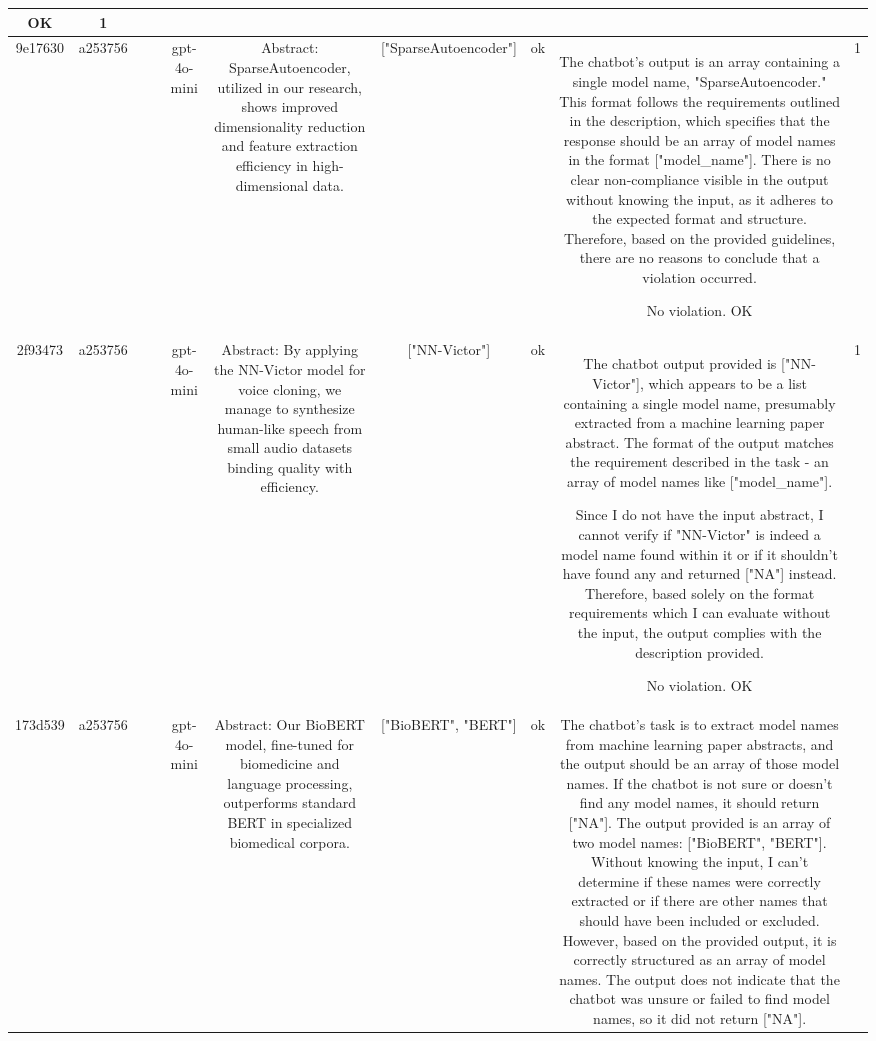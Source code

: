 \begin{table}[h!]
\begin{tabular}{|c|c|c|c|c|c|c|c|c|c|}
OK & 1\\
\hline
9e17630 & a253756 &  &  & gpt-4o-mini & Abstract: SparseAutoencoder, utilized in our research, shows improved dimensionality reduction and feature extraction efficiency in high-dimensional data. & ["SparseAutoencoder"] & ok & The chatbot's output is an array containing a single model name, "SparseAutoencoder." This format follows the requirements outlined in the description, which specifies that the response should be an array of model names in the format ["model_name"]. There is no clear non-compliance visible in the output without knowing the input, as it adheres to the expected format and structure. Therefore, based on the provided guidelines, there are no reasons to conclude that a violation occurred.

No violation.
OK & 1\\
\hline
2f93473 & a253756 &  &  & gpt-4o-mini & Abstract: By applying the NN-Victor model for voice cloning, we manage to synthesize human-like speech from small audio datasets binding quality with efficiency. & ["NN-Victor"] & ok & The chatbot output provided is ["NN-Victor"], which appears to be a list containing a single model name, presumably extracted from a machine learning paper abstract. The format of the output matches the requirement described in the task - an array of model names like ["model_name"]. 

Since I do not have the input abstract, I cannot verify if "NN-Victor" is indeed a model name found within it or if it shouldn't have found any and returned ["NA"] instead. Therefore, based solely on the format requirements which I can evaluate without the input, the output complies with the description provided.

No violation.
OK & 1\\
\hline
173d539 & a253756 &  &  & gpt-4o-mini & Abstract: Our BioBERT model, fine-tuned for biomedicine and language processing, outperforms standard BERT in specialized biomedical corpora. & ["BioBERT", "BERT"] & ok & The chatbot's task is to extract model names from machine learning paper abstracts, and the output should be an array of those model names. If the chatbot is not sure or doesn't find any model names, it should return ["NA"]. The output provided is an array of two model names: ["BioBERT", "BERT"]. Without knowing the input, I can't determine if these names were correctly extracted or if there are other names that should have been included or excluded. However, based on the provided output, it is correctly structured as an array of model names. The output does not indicate that the chatbot was unsure or failed to find model names, so it did not return ["NA"]. 


\end{tabular}
\end{table}
